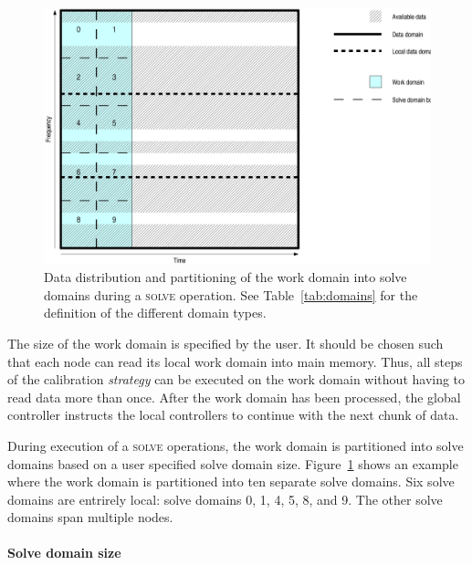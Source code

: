 \documentclass[10pt]{lofar}
\newcommand{\solve}{\textsc{solve}\xspace}
\begin{document}
\begin{figure}[htbp]
\centering
\includegraphics[scale=0.5]{images/solve_domains.ps}
\caption{Data distribution and partitioning of the work domain into solve
domains during a \solve operation. See Table~\ref{tab:domains} for the definition
of the different domain types.}
\label{fig:domains}
\end{figure}

The size of the work domain is specified by the user. It should be chosen such
that each node can read its local work domain into main memory. Thus, all steps
of the calibration \emph{strategy} can be executed on the work domain without
having to read data more than once. After the work domain has been processed,
the global controller instructs the local controllers to continue with the next
chunk of data.

During execution of a \solve operations, the work domain is partitioned into
solve domains based on a user specified solve domain size.
Figure~\ref{fig:domains} shows an example where the work domain is partitioned
into ten separate solve domains. Six solve domains are entrirely local: solve
domains 0, 1, 4, 5, 8, and 9. The other solve domains span multiple nodes.


\paragraph{Solve domain size}
\end{document}
